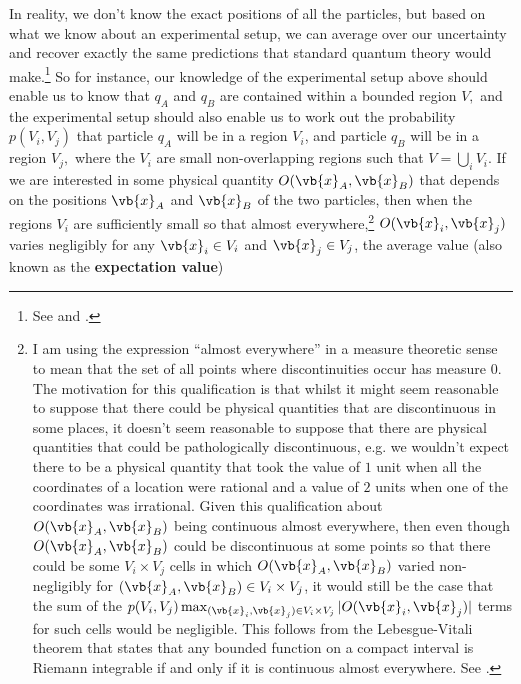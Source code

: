 \documentclass[12pt]{report}
\begin{document}
In reality, we don't know the exact positions of all the particles, but based on what we know about an experimental setup, we can average over our uncertainty and recover exactly the same predictions that standard quantum theory would make.\footnote{See \cite{BohmDavid1952A} and \cite{BohmDavid1952B}.} So for instance, our knowledge of the experimental setup above should enable us  to know that $q_A$ and $q_B$ are contained within a bounded region $V,$ %
%
and the experimental setup should also enable us to work out the probability  $p(V_i, V_j)$ %
%
that particle $q_A$  will be in a region $V_i$, and particle $q_B$ will be in a region $V_j,$ where the $V_i$ are small non-overlapping regions such that $V=\bigcup_iV_i$. %
%
If we are interested in some physical quantity $O(\vb{x}_A, \vb{x}_B)$ %
%
that depends on the positions $\vb{x}_A$ and $\vb{x}_B$ of the two particles, then when the regions $V_i$ are  sufficiently small so that almost everywhere,\footnote{I am using the expression ``almost everywhere'' in a measure theoretic sense to mean that the set of all points where discontinuities occur has measure $0$. The motivation for this qualification is that whilst it might seem reasonable to suppose that there could be physical quantities that are discontinuous in some places, it doesn't seem reasonable to suppose that there are physical quantities that could be pathologically discontinuous, e.g. we wouldn't expect there to be a physical quantity that took the value of $1$ unit when all the coordinates of a location were rational and a value of $2$ units when one of the coordinates was irrational. Given this qualification about $O(\vb{x}_A,\vb{x}_B)$ being continuous almost everywhere, then even though $O(\vb{x}_A,\vb{x}_B)$ could be discontinuous at some points so that there could be some  $V_i\times V_j$ cells in which $O(\vb{x}_A,\vb{x}_B)$ varied non-negligibly for $(\vb{x}_A,\vb{x}_B)\in V_i\times V_j$, it would still be the case that the sum of the $p(V_i, V_j)\max_{(\vb{x}_i,\vb{x}_j)\in V_i\times V_j}|O(\vb{x}_i,\vb{x}_j)|$ terms for such cells would be negligible. This follows from the Lebesgue-Vitali theorem that states that any bounded function on a compact interval is Riemann integrable if and only if it is continuous almost everywhere. See \cite{wiki:Riemann}.} $O(\vb{x}_i, \vb{x}_j)$ varies negligibly for any $\vb{x}_i\in V_i$ and $\vb{x}_j\in V_j$,  the average value (also known as the \textbf{expectation value})
\end{document}

